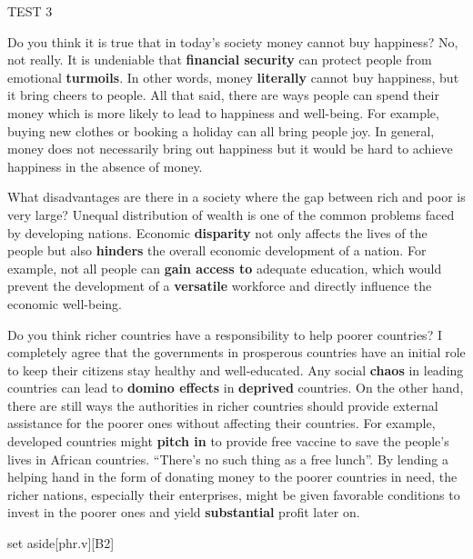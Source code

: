 \begin{glossarymc}[Cambridge 12]
\begin{test}{TEST 3}
    \begin{qa}{Do you think it is true that in today’s society money cannot buy happiness?}
    No, not really. It is undeniable that \textbf{financial security} can protect people from emotional \textbf{turmoils}. In other words, money \textbf{literally} cannot buy happiness, but it bring cheers to people. All that said, there are ways people can spend their money which is more likely to lead to happiness and well-being. For example, buying new clothes or booking a holiday can all bring people joy. In general, money does not necessarily bring out happiness but it would be hard to achieve happiness in the absence of money.
    \end{qa}

    \begin{qa}{What disadvantages are there in a society where the gap between rich and poor is very large?}
    Unequal distribution of wealth is one of the common problems faced by developing nations. Economic \textbf{disparity} not only affects the lives of the people but also \textbf{hinders} the overall economic development of a nation. For example, not all people can \textbf{gain access to} adequate education, which would prevent the development of a \textbf{versatile} workforce and directly influence the economic well-being.
    \end{qa}

    \begin{qa}{Do you think richer countries have a responsibility to help poorer countries?}
    I completely agree that the governments in prosperous countries have an initial role to keep their citizens stay healthy and well-educated. Any social \textbf{chaos} in leading countries can lead to \textbf{domino effects} in \textbf{deprived} countries. On the other hand, there are still ways the authorities in richer countries should provide external assistance for the poorer ones without affecting their countries. For example, developed countries might \textbf{pitch in} to provide free vaccine to save the people’s lives in African countries. “There’s no such thing as a free lunch”. By lending a helping hand in the form of donating money to the poorer countries in need, the richer nations, especially their enterprises, might be given favorable conditions to invest in the poorer ones and yield \textbf{substantial} profit later on.
    \end{qa}

        \begin{VocabExplain}[Part 3]
            \begin{ExplainCard}{set aside}[phr.v][B2]
            \end{ExplainCard}


\end{VocabExplain}
\end{test}
\end{glossarymc}
